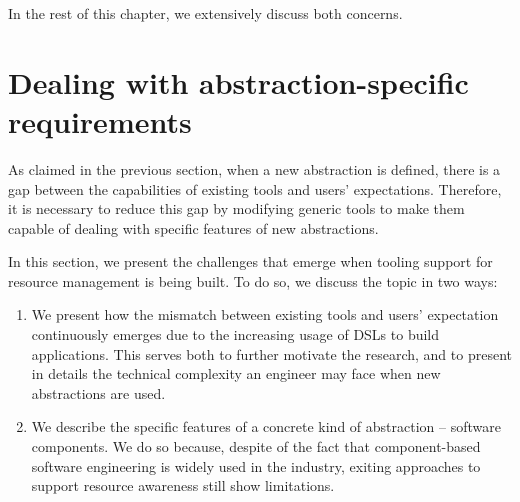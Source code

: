 In the rest of this chapter, we extensively discuss both concerns.

\section{Dealing with abstraction-specific requirements} \label{sec:abstraction-specific-requirements}
As claimed in the previous section, when a new abstraction is defined, there is a gap between the capabilities of existing tools and users' expectations.
Therefore, it is necessary to reduce this gap by modifying generic tools to make them capable of dealing with specific features of new abstractions.

In this section, we present the challenges that emerge when tooling support for resource management is being built.
To do so, we discuss the topic in two ways:

\begin{enumerate}
\item  We present how the mismatch between existing tools and users' expectation continuously emerges due to the increasing usage of DSLs to build applications.
This serves both to further motivate the research, and to present in details the technical complexity an engineer may face when new abstractions are used.

\item We describe the specific features of a concrete kind of abstraction -- software components.
We do so because, despite of the fact that component-based software engineering is widely used in the industry, exiting approaches to support resource awareness still show limitations.
\end{enumerate}

